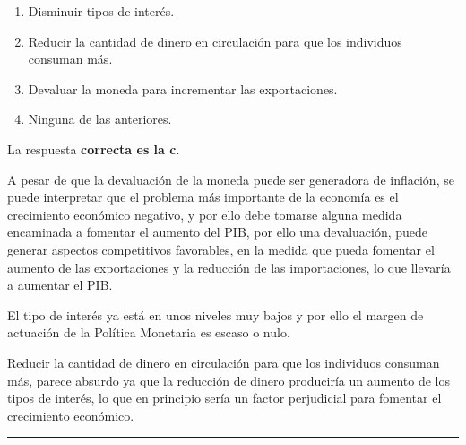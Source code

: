 \documentclass[
  letterpaper,
  DIV=11,
  numbers=noendperiod]{scrreprt}
\begin{document}
\begin{enumerate}
\def\labelenumi{\alph{enumi})}
\item
  Disminuir tipos de interés.
\item
  Reducir la cantidad de dinero en circulación para que los individuos
  consuman más.
\item
  Devaluar la moneda para incrementar las exportaciones.
\item
  Ninguna de las anteriores.
\end{enumerate}

\begin{tcolorbox}[enhanced jigsaw, opacityback=0, bottomrule=.15mm, colframe=quarto-callout-tip-color-frame, arc=.35mm, leftrule=.75mm, breakable, colback=white, rightrule=.15mm, toprule=.15mm, left=2mm]
\begin{minipage}[t]{5.5mm}
\textcolor{quarto-callout-tip-color}{\faLightbulb}
\end{minipage}%
\begin{minipage}[t]{\textwidth - 5.5mm}

La respuesta \textbf{correcta es la c}.

A pesar de que la devaluación de la moneda puede ser generadora de
inflación, se puede interpretar que el problema más importante de la
economía es el crecimiento económico negativo, y por ello debe tomarse
alguna medida encaminada a fomentar el aumento del PIB, por ello una
devaluación, puede generar aspectos competitivos favorables, en la
medida que pueda fomentar el aumento de las exportaciones y la reducción
de las importaciones, lo que llevaría a aumentar el PIB.

El tipo de interés ya está en unos niveles muy bajos y por ello el
margen de actuación de la Política Monetaria es escaso o nulo.

Reducir la cantidad de dinero en circulación para que los individuos
consuman más, parece absurdo ya que la reducción de dinero produciría un
aumento de los tipos de interés, lo que en principio sería un factor
perjudicial para fomentar el crecimiento económico.

\end{minipage}%
\end{tcolorbox}

\begin{center}\rule{0.5\linewidth}{0.5pt}\end{center}
\end{document}
